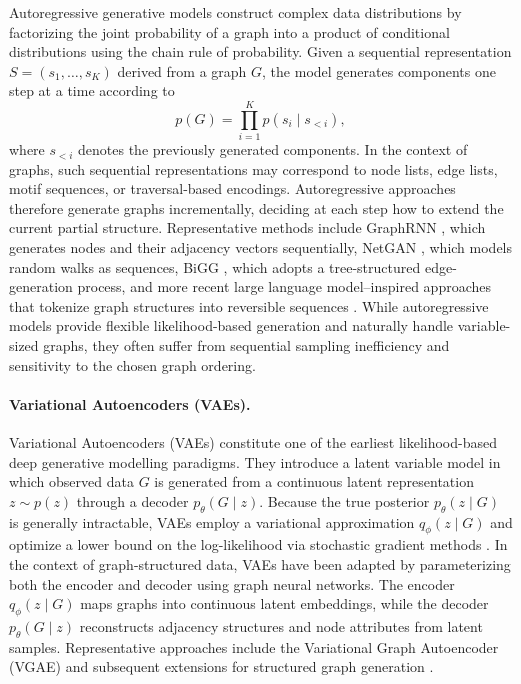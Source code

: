 Autoregressive generative models construct complex data distributions by
factorizing the joint probability of a graph into a product of conditional
distributions using the chain rule of probability.
Given a sequential representation $S = (s_1, \dots, s_K)$ derived from a graph
$G$, the model generates components one step at a time according to
\[
p(G) = \prod_{i=1}^{K} p(s_i \mid s_{<i}),
\]
where $s_{<i}$ denotes the previously generated components.
In the context of graphs, such sequential representations may correspond to
node lists, edge lists, motif sequences, or traversal-based encodings.
Autoregressive approaches therefore generate graphs incrementally, deciding at
each step how to extend the current partial structure.
Representative methods include GraphRNN \citep{graph}, which generates
nodes and their adjacency vectors sequentially, NetGAN \citep{bojchevski2018netgan},
which models random walks as sequences, BiGG \citep{dai2020scalable}, which adopts
a tree-structured edge-generation process, and more recent large language
model–inspired approaches that tokenize graph structures into reversible
sequences \citep{zhao2023graphgpt}.
While autoregressive models provide flexible likelihood-based generation and
naturally handle variable-sized graphs, they often suffer from sequential
sampling inefficiency and sensitivity to the chosen graph ordering.
\paragraph{Variational Autoencoders (VAEs).}
Variational Autoencoders (VAEs) constitute one of the earliest
likelihood-based deep generative modelling paradigms.
They introduce a latent variable model in which observed data
$G$ is generated from a continuous latent representation
$z \sim p(z)$ through a decoder $p_\theta(G \mid z)$.
Because the true posterior $p_\theta(z \mid G)$ is generally intractable,
VAEs employ a variational approximation
$q_\phi(z \mid G)$ and optimize a lower bound on the log-likelihood
via stochastic gradient methods \citep{kingma2013auto,rezende2014stochastic}.
In the context of graph-structured data, VAEs have been adapted
by parameterizing both the encoder and decoder using graph neural
networks. The encoder $q_\phi(z \mid G)$ maps graphs into
continuous latent embeddings, while the decoder $p_\theta(G \mid z)$
reconstructs adjacency structures and node attributes from latent samples.
Representative approaches include the Variational Graph Autoencoder (VGAE)
\citep{kipf2016vgae} and subsequent extensions for structured
graph generation \citep{simonovsky2018graphvae}.

